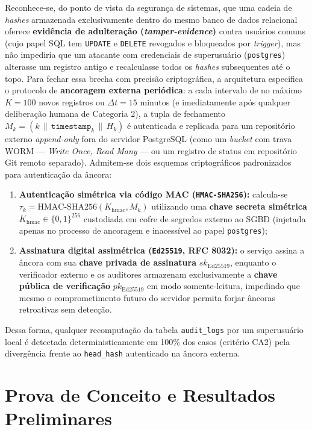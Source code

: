 \documentclass[12pt,openany,oneside,a4paper,english,brazilian,sumario=tradicional]{abntex2}
\begin{document}
Reconhece-se, do ponto de vista da segurança de sistemas, que uma cadeia de \textit{hashes} armazenada exclusivamente dentro do mesmo banco de dados relacional oferece \textbf{evidência de adulteração (\textit{tamper-evidence})} contra usuários comuns (cujo papel SQL tem \texttt{UPDATE} e \texttt{DELETE} revogados e bloqueados por \textit{trigger}), mas não impediria que um atacante com credenciais de superusuário (\texttt{postgres}) alterasse um registro antigo e recalculasse todos os \textit{hashes} subsequentes até o topo. Para fechar essa brecha com precisão criptográfica, a arquitetura especifica o protocolo de \textbf{ancoragem externa periódica}: a cada intervalo de no máximo $K=100$ novos registros ou $\Delta t = 15$ minutos (e imediatamente após qualquer deliberação humana de Categoria 2), a tupla de fechamento $M_k = (k \,\|\, \texttt{timestamp}_k \,\|\, H_k)$ é autenticada e replicada para um repositório externo \textit{append-only} fora do servidor PostgreSQL (como um \textit{bucket} com trava WORM — \textit{Write Once, Read Many} — ou um registro de status em repositório Git remoto separado). Admitem-se dois esquemas criptográficos padronizados para autenticação da âncora:
\begin{enumerate}
  \item \textbf{Autenticação simétrica via código MAC (\texttt{HMAC-SHA256}):} calcula-se $\tau_k = \mathrm{HMAC\text{-}SHA256}(K_{\text{hmac}}, M_k)$ utilizando uma \textbf{chave secreta simétrica} $K_{\text{hmac}} \in \{0,1\}^{256}$ custodiada em cofre de segredos externo ao SGBD (injetada apenas no processo de ancoragem e inacessível ao papel \texttt{postgres});
  \item \textbf{Assinatura digital assimétrica (\texttt{Ed25519}, RFC 8032):} o serviço assina a âncora com sua \textbf{chave privada de assinatura} $sk_{\text{Ed25519}}$, enquanto o verificador externo e os auditores armazenam exclusivamente a \textbf{chave pública de verificação} $pk_{\text{Ed25519}}$ em modo somente-leitura, impedindo que mesmo o comprometimento futuro do servidor permita forjar âncoras retroativas sem detecção.
\end{enumerate}
Dessa forma, qualquer recomputação da tabela \texttt{audit\_logs} por um superusuário local é detectada deterministicamente em 100\% dos casos (critério CA2) pela divergência frente ao \texttt{head\_hash} autenticado na âncora externa.

\chapter{Prova de Conceito e Resultados Preliminares}\label{cap:poc}
\end{document}
